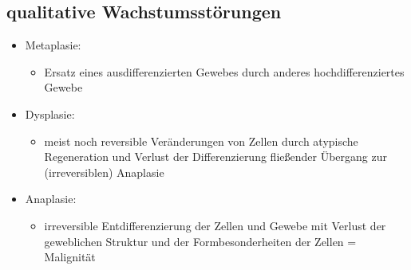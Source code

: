 \subsection{qualitative Wachstumsstörungen}
	\begin{itemize}
		\item Metaplasie:
			\begin{itemize}
				\item Ersatz eines ausdifferenzierten Gewebes durch anderes hochdifferenziertes Gewebe
			\end{itemize}
		\item Dysplasie:
			\begin{itemize}
				\item meist noch reversible Veränderungen von Zellen durch atypische Regeneration und Verlust der Differenzierung fließender Übergang zur (irreversiblen) Anaplasie
			\end{itemize}
		\item Anaplasie:
			\begin{itemize}
				\item irreversible Entdifferenzierung der Zellen und Gewebe mit Verlust der geweblichen Struktur und der Formbesonderheiten der Zellen = Malignität
			\end{itemize}
	\end{itemize}